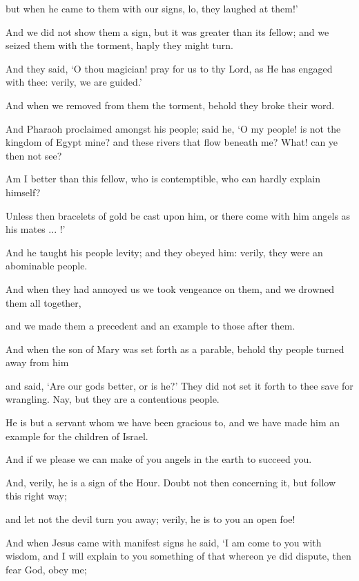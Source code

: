 \documentclass[fontsize=14pt, letterpaper, notitlepage, openany, DIV=12]{scrbook} %
\begin{document}
\noindent[43:47]
but when he came to them with our signs, lo, they laughed at them!'

\noindent[43:48]
And we did not show them a sign, but it was greater than its fellow; and we seized them
with the torment, haply they might turn.

\noindent[43:49]
And they said, `O thou magician! pray for us to thy Lord, as He has engaged with thee:
verily, we are guided.'

\noindent[43:50]
And when we removed from them the torment, behold they broke their word.

\noindent[43:51]
And Pharaoh proclaimed amongst his people; said he, `O my people! is not the kingdom
of Egypt mine? and these rivers that flow beneath me? What! can ye then not see?

\noindent[43:52]
Am I better than this fellow, who is contemptible, who can hardly explain himself?

\noindent[43:53]
Unless then bracelets of gold be cast upon him, or there come with him angels as his
mates ... !'

\noindent[43:54]
And he taught his people levity; and they obeyed him: verily, they were an abominable
people.

\noindent[43:55]
And when they had annoyed us we took vengeance on them, and we drowned them all
together,

\noindent[43:56]
and we made them a precedent and an example to those after them.

\noindent[43:57]
And when the son of Mary was set forth as a parable, behold thy people turned away
from him

\noindent[43:58]
and said, `Are our gods better, or is he?' They did not set it forth to thee save for
wrangling. Nay, but they are a contentious people.

\noindent[43:59]
He is but a servant whom we have been gracious to, and we have made him an example
for the children of Israel.

\noindent[43:60]
And if we please we can make of you angels in the earth to succeed you.

\noindent[43:61]
And, verily, he is a sign of the Hour. Doubt not then concerning it, but follow this right
way;

\noindent[43:62]
and let not the devil turn you away; verily, he is to you an open foe!

\noindent[43:63]
And when Jesus came with manifest signs he said, `I am come to you with wisdom, and I
will explain to you something of that whereon ye did dispute, then fear God, obey me;
\end{document}
